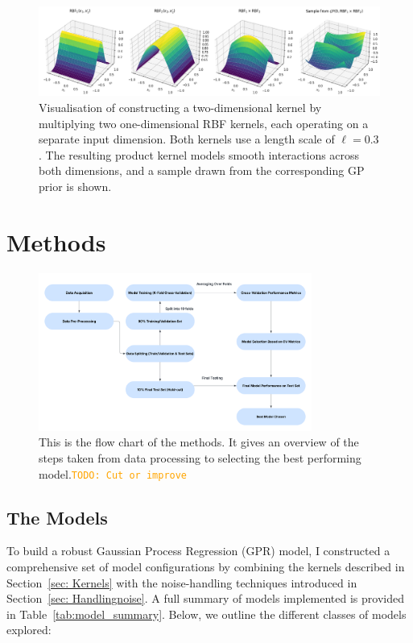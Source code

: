 \documentclass{ucdgradtaughtthesis}
\newcommand{\todo}[1]{\textcolor{orange}{\texttt{TODO: #1}}}
\begin{document}
\begin{figure}[H]
    \centering
    \includegraphics[width=\textwidth]{LatexPlots/final_gps_plots/2dkernels.png}
    \caption[Visualising the construction of a multi-dimensional kernel.]{
    Visualisation of constructing a two-dimensional kernel by multiplying two one-dimensional RBF kernels, each operating on a separate input dimension. Both kernels use a length scale of \(\ell = 0.3\). 
    The resulting product kernel models smooth interactions across both dimensions, and a sample drawn from the corresponding GP prior is shown.}
    \label{fig:2dkernels}
\end{figure}

\chapter{Methods}
\begin{figure}[H]
    \centering
   \includegraphics[width=0.8\textwidth]{LatexPlots/Flowchart.png}
    \caption[Flow chart of the process taken from data processing to selecting the best performing model.]{This is the flow chart of the methods. It gives an overview of the steps taken
     from data processing to selecting the best performing model.\todo{Cut or improve}}
    \label{fig:flowchart}
\end{figure}
\section{The Models}
\label{subsec:Models}
To build a robust Gaussian Process Regression (GPR) model, I constructed a comprehensive set of model configurations by combining the kernels described in Section~\ref{sec: Kernels} with the noise-handling techniques introduced in Section~\ref{sec: Handlingnoise}. 
A full summary of models implemented is provided in Table~\ref{tab:model_summary}. Below, we outline the different classes of models explored:
\end{document}
